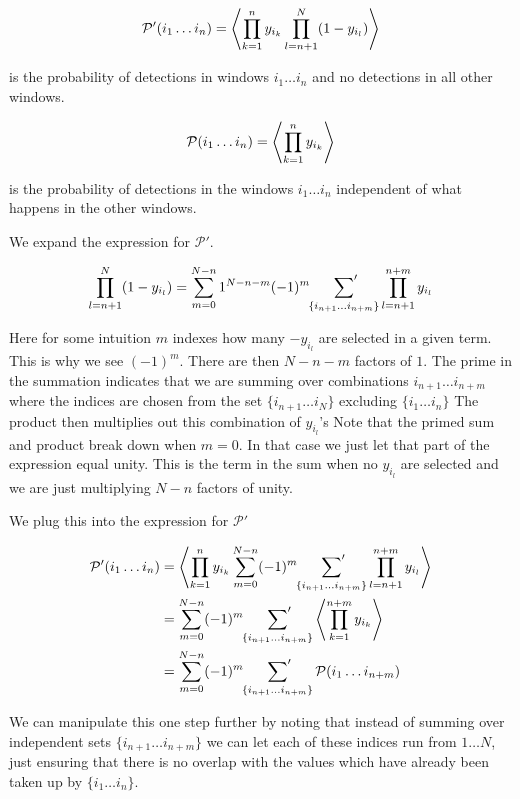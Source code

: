 \documentclass[12pt]{article}
\begin{document}
\begin{align}
\mathcal{P}'(i_1 \ldots i_n) = \Braket{\prod_{k=1}^n y_{i_k} \prod_{l=n+1}^{N} (1-y_{i_l})}
\end{align}

is the probability of detections in windows $i_1 \ldots i_n$ and no detections in all other windows.

\begin{align}
\mathcal{P}(i_1 \ldots i_n) = \Braket{\prod_{k=1}^n y_{i_k}}
\end{align}

is the probability of detections in the windows $i_1 \ldots i_n$ independent of what happens in the other windows. 

We expand the expression for $\mathcal{P}'$.

\begin{align}
\prod_{l=n+1}^N (1-y_{i_l}) = \sum_{m=0}^{N-n} 1^{N-n-m} (-1)^{m} \sideset{}{'}\sum_{\{i_{n+1} \ldots i_{n+m}\}} \prod_{l=n+1}^{n+m} y_{i_l}
\end{align}

Here for some intuition $m$ indexes how many $-y_{i_l}$ are selected in a given term. This is why we see $(-1)^m$. There are then $N-n-m$ factors of $1$. The prime in the summation indicates that we are summing over combinations $i_{n+1} \ldots i_{n+m}$ where the indices are chosen from the set $\{i_{n+1} \ldots i_N\}$ excluding $\{ i_1 \ldots i_n\}$ The product then multiplies out this combination of $y_{i_l}$'s Note that the primed sum and product break down when $m=0$. In that case we just let that part of the expression equal unity. This is the term in the sum when no $y_{i_l}$ are selected and we are just multiplying $N-n$ factors of unity.

We plug this into the expression for $\mathcal{P}'$

\begin{align}
\mathcal{P}'(i_1 \ldots i_n) &= \Braket{\prod_{k=1}^n y_{i_k} \sum_{m=0}^{N-n} (-1)^{m} \sideset{}{'}\sum_{\{i_{n+1} \ldots i_{n+m}\}} \prod_{l=n+1}^{n+m} y_{i_l}}\\
&= \sum_{m=0}^{N-n} (-1)^m \sideset{}{'}\sum_{\{i_{n+1} \ldots i_{n+m}\}} \Braket{\prod_{k=1}^{n+m} y_{i_k}}\\
&= \sum_{m=0}^{N-n} (-1)^m \sideset{}{'}\sum_{\{i_{n+1} \ldots i_{n+m}\}} \mathcal{P}(i_1 \ldots i_{n+m})
\end{align}

We can manipulate this one step further by noting that instead of summing over independent sets $\{i_{n+1} \ldots i_{n+m}\}$ we can let each of these indices run from $1 \ldots N$, just ensuring that there is no overlap with the values which have already been taken up by $\{i_1 \ldots i_n\}$.
\end{document}
